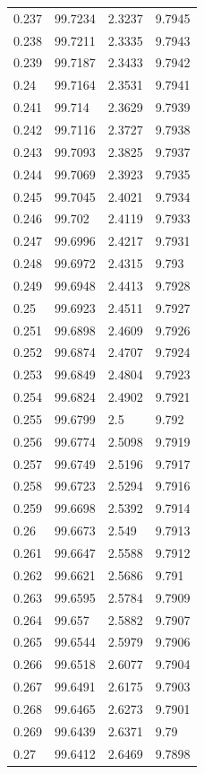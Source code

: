 \begin{tabular}{llll}
0.237 & 99.7234 & 2.3237 & 9.7945 \\
0.238 & 99.7211 & 2.3335 & 9.7943 \\
0.239 & 99.7187 & 2.3433 & 9.7942 \\
0.24 & 99.7164 & 2.3531 & 9.7941 \\
0.241 & 99.714 & 2.3629 & 9.7939 \\
0.242 & 99.7116 & 2.3727 & 9.7938 \\
0.243 & 99.7093 & 2.3825 & 9.7937 \\
0.244 & 99.7069 & 2.3923 & 9.7935 \\
0.245 & 99.7045 & 2.4021 & 9.7934 \\
0.246 & 99.702 & 2.4119 & 9.7933 \\
0.247 & 99.6996 & 2.4217 & 9.7931 \\
0.248 & 99.6972 & 2.4315 & 9.793 \\
0.249 & 99.6948 & 2.4413 & 9.7928 \\
0.25 & 99.6923 & 2.4511 & 9.7927 \\
0.251 & 99.6898 & 2.4609 & 9.7926 \\
0.252 & 99.6874 & 2.4707 & 9.7924 \\
0.253 & 99.6849 & 2.4804 & 9.7923 \\
0.254 & 99.6824 & 2.4902 & 9.7921 \\
0.255 & 99.6799 & 2.5 & 9.792 \\
0.256 & 99.6774 & 2.5098 & 9.7919 \\
0.257 & 99.6749 & 2.5196 & 9.7917 \\
0.258 & 99.6723 & 2.5294 & 9.7916 \\
0.259 & 99.6698 & 2.5392 & 9.7914 \\
0.26 & 99.6673 & 2.549 & 9.7913 \\
0.261 & 99.6647 & 2.5588 & 9.7912 \\
0.262 & 99.6621 & 2.5686 & 9.791 \\
0.263 & 99.6595 & 2.5784 & 9.7909 \\
0.264 & 99.657 & 2.5882 & 9.7907 \\
0.265 & 99.6544 & 2.5979 & 9.7906 \\
0.266 & 99.6518 & 2.6077 & 9.7904 \\
0.267 & 99.6491 & 2.6175 & 9.7903 \\
0.268 & 99.6465 & 2.6273 & 9.7901 \\
0.269 & 99.6439 & 2.6371 & 9.79 \\
0.27 & 99.6412 & 2.6469 & 9.7898 \\

\end{tabular}

